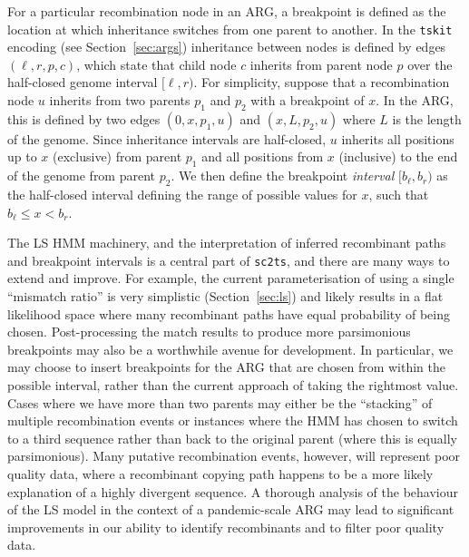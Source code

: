 \documentclass{article}
\begin{document}
For a particular recombination node in an ARG, a  breakpoint
is defined as the location at which inheritance switches from one parent
to another.
In the \texttt{tskit} encoding (see Section~\ref{sec:args}) inheritance between
nodes is defined by edges $(\ell, r, p, c)$, which state that child node $c$
inherits from parent node $p$
over the half-closed genome interval $[\ell, r)$.
For simplicity, suppose that a recombination node $u$ inherits from two
parents $p_1$ and $p_2$ with a breakpoint of $x$.
In the ARG, this is defined by two edges
$(0, x, p_1, u)$ and $(x, L, p_2, u)$ where $L$ is the length of the genome.
Since inheritance intervals are half-closed,
$u$ inherits all positions up to $x$ (exclusive) from parent $p_1$
and all positions from $x$ (inclusive) to the end of the genome from parent
$p_2$. We then define the breakpoint \emph{interval} $[b_\ell, b_r)$ as the
half-closed interval defining the range of possible values for $x$, such
that $b_\ell \leq x < b_r$.

The LS HMM machinery, and the interpretation of inferred recombinant paths and
breakpoint intervals is a central part of \texttt{sc2ts}, and there are many
ways to extend and improve. For example, the current parameterisation of using
a single ``mismatch ratio'' is very simplistic (Section~\ref{sec:ls}) and likely
results in a flat likelihood space where many recombinant paths have equal
probability of being chosen.
Post-processing the match results to produce
more parsimonious breakpoints may also be a worthwhile avenue for development.
In particular, we may choose to insert breakpoints for the ARG that are chosen
from within the possible interval, rather than the current approach of taking
the rightmost value. Cases where we have more than two parents may either be
the ``stacking'' of multiple recombination events or instances where
the HMM has chosen to switch to a third sequence rather than back to
the original parent (where this is equally parsimonious). Many putative
recombination events, however, will represent poor quality data, where
a recombinant copying path happens to be a more likely explanation
of a highly divergent sequence.
A thorough analysis of the behaviour of the LS model in the context
of a pandemic-scale ARG may lead to significant improvements in our
ability to identify recombinants and to filter poor quality data.
\end{document}

